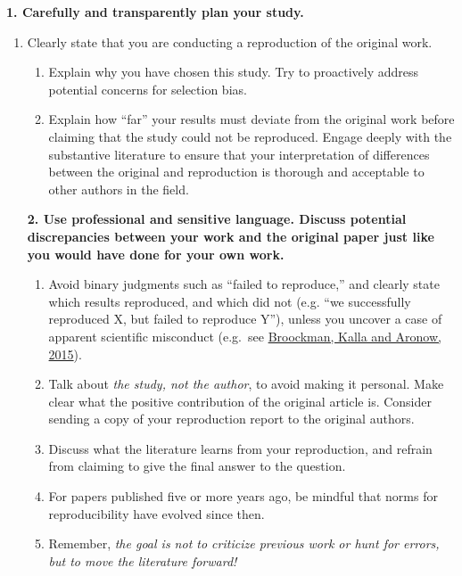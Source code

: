 \documentclass[]{book}
\providecommand{\tightlist}{%
  \setlength{\itemsep}{0pt}\setlength{\parskip}{0pt}}
\begin{document}
\textbf{1. Carefully and transparently plan your study. }

\begin{enumerate}
\def\labelenumi{\alph{enumi}.}
\tightlist
\item
  Clearly state that you are conducting a reproduction of the original work.

  \begin{enumerate}
  \def\labelenumii{\alph{enumii}.}
  \setcounter{enumii}{1}
  \tightlist
  \item
    Explain why you have chosen this study. Try to proactively address potential concerns for selection bias.\\
  \item
    Explain how ``far'' your results must deviate from the original work before claiming that the study could not be reproduced. Engage deeply with the substantive literature to ensure that your interpretation of differences between the original and reproduction is thorough and acceptable to other authors in the field.
  \end{enumerate}

  \textbf{2. Use professional and sensitive language. Discuss potential discrepancies between your work and the original paper just like you would have done for your own work.}

  \begin{enumerate}
  \def\labelenumii{\alph{enumii}.}
  \tightlist
  \item
    Avoid binary judgments such as ``failed to reproduce,'' and clearly state which results reproduced, and which did not (e.g. ``we successfully reproduced X, but failed to reproduce Y''), unless you uncover a case of apparent scientific misconduct (e.g.~see \href{https://osf.io/qy2se/}{Broockman, Kalla and Aronow, 2015}).\\
  \item
    Talk about \emph{the study, not the author}, to avoid making it personal. Make clear what the positive contribution of the original article is. Consider sending a copy of your reproduction report to the original authors.\\
  \item
    Discuss what the literature learns from your reproduction, and refrain from claiming to give the final answer to the question.\\
  \item
    For papers published five or more years ago, be mindful that norms for reproducibility have evolved since then.\\
  \item
    Remember, \emph{the goal is not to criticize previous work or hunt for errors, but to move the literature forward!}
  \end{enumerate}
\end{enumerate}
\end{document}
